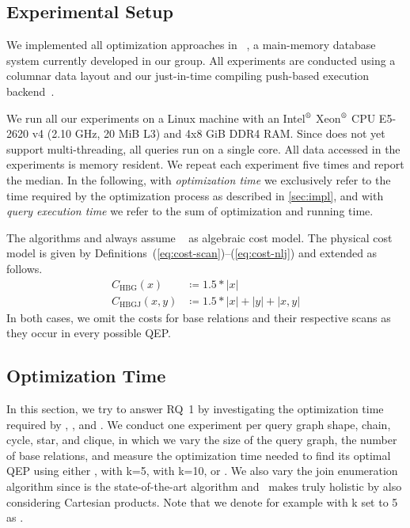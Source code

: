 \subsection{Experimental Setup}
\label{sec:eval-setup}

We implemented all  optimization approaches in \mutable~\cite{mutable_demo,mutable_website}, a main-memory database system currently developed in our group.  All experiments are conducted using a columnar data layout and our just-in-time compiling push-based execution backend~\cite{jit_compilation}.

We run all our experiments on a Linux machine with an Intel$^\text{\textregistered}$ Xeon$^\text{\textregistered}$ CPU E5-2620 v4 (2.10 GHz, 20 MiB L3) and 4x8 GiB DDR4 RAM.  Since \mutable does not yet support multi-threading, all queries run on a single core.  All data accessed in the experiments is memory resident.     We repeat each experiment five times and report the median.  In the following, with \emph{optimization time} we exclusively refer to the time required by the optimization process as described in \autoref{sec:impl}, and with  \emph{query execution time} we refer to the sum of optimization and running time.

The algorithms \split and \topk always assume \Cout~\cite{book_moerkotte, mutable_join_ordering} as algebraic cost model.  The physical cost model is given by Definitions~(\ref{eq:cost-scan})--(\ref{eq:cost-nlj}) and extended as follows.
\begin{align}
    C_\text{HBG}(x) &\coloneq 1.5 * |x| \label{eq:cost-hbg}\\
    C_\text{HBGJ}(x,y) &\coloneq 1.5 * |x| + |y| + |x,y| \label{eq:cost-hbgj}
\end{align}
  In both cases, we omit the costs for base relations and their respective scans as they occur in every possible QEP.

\subsection{Optimization Time}
\label{sec:eval-opt_time}

In this section, we try to answer RQ~1 by investigating the optimization time required by \split, \holistic, \revisionadd{\holisticpruned,} and \topk. We conduct one experiment per query graph shape, \ie chain, cycle, star, and clique, in which we vary the size of the query graph, \ie the number of base relations, and measure the optimization time needed to find its optimal QEP using either \split, \topk with k=5, \topk with k=10, \revisionadd{\holisticpruned,} or \holistic.  We also vary the join enumeration algorithm since \DPccp is the state-of-the-art algorithm and \PEall\ makes \holistic truly holistic by also considering Cartesian products.  Note that we denote for example \topk with k set to 5 as .

